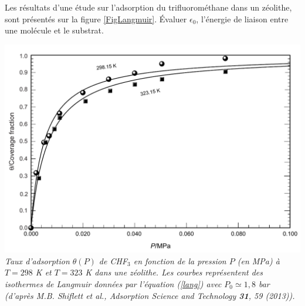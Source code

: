 \question
Les résultats d'une étude sur l'adsorption du trifluorométhane dans un zéolithe, sont présentés sur la figure \ref{FigLangmuir}. \'Evaluer $\epsilon_0$, l'énergie de liaison entre une molécule et le substrat.

\begin{center}
\includegraphics{../Fig/Langmuir} \\
\textit{Taux d'adsorption $\theta(P)$  de CHF$_3$ en fonction de la pression $P$ (en MPa) à $T=298$ K et $T=323$ K dans une zéolithe. Les courbes représentent des isothermes de Langmuir données par l'équation (\ref{lang}) avec $P_0 \simeq 1,8$ bar (d'après M.B. Shiflett et al., Adsorption Science and Technology {\bf 31}, 59 (2013)). \label{FigLangmuir}}
\end{center}
